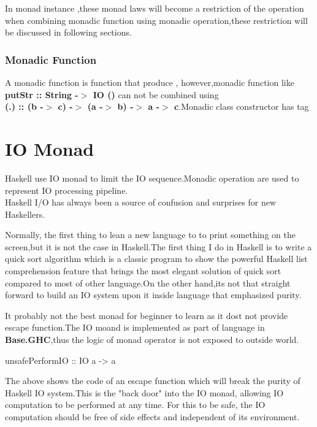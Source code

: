 In monad instance ,these monad laws will become a restriction of the operation when combining monadic function using monadic operation,these restriction will be discussed in following sections.


\subsubsection{Monadic Function}
A monadic function is function that produce , however,monadic function like \textbf{putStr :: String -$>$ IO ()} can not be combined using \\ \textbf{(.) :: (b -$>$ c) -$>$ (a -$>$ b) -$>$ a -$>$ c}.Monadic class constructor has tag 



\section{IO Monad}
Haskell use IO monad to limit the IO sequence.Monadic operation are used to represent IO processing pipeline.\\

Haskell I/O has always been a source of confusion and surprises for new Haskellers.

Normally, the first thing to lean a new language to to print something on the screen,but it is not the case in Haskell.The first thing I do in Haskell is to write a quick sort algorithm which is a classic program to show the powerful Haskell list comprehension feature that brings the most elegant solution of quick sort compared to most of other language.On the other hand,its not that straight forward to build an IO system upon it inside language that emphasized purity.



It probably not the best monad for beginner to learn as it dost not provide escape function.The IO moand is implemented as part of language in \textbf{Base.GHC},thus the logic of monad operator is not exposed to outside world.

\begin{hcode}
unsafePerformIO :: IO a -> a
\end{hcode}

The above shows the code of an escape function which will break the purity of Haskell IO system.This is the "back door" into the IO monad, allowing IO computation to be performed at any time. For this to be safe, the IO computation should be free of side effects and independent of its environment.%


